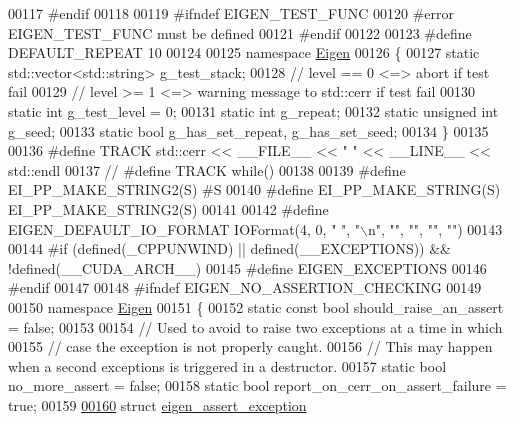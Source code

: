 \begin{DoxyCode}
00117 \textcolor{preprocessor}{#endif}
00118 
00119 \textcolor{preprocessor}{#ifndef EIGEN\_TEST\_FUNC}
00120 \textcolor{preprocessor}{#error EIGEN\_TEST\_FUNC must be defined}
00121 \textcolor{preprocessor}{#endif}
00122 
00123 \textcolor{preprocessor}{#define DEFAULT\_REPEAT 10}
00124 
00125 \textcolor{keyword}{namespace }\hyperlink{namespace_eigen}{Eigen}
00126 \{
00127   \textcolor{keyword}{static} std::vector<std::string> g\_test\_stack;
00128   \textcolor{comment}{// level == 0 <=> abort if test fail}
00129   \textcolor{comment}{// level >= 1 <=> warning message to std::cerr if test fail}
00130   \textcolor{keyword}{static} \textcolor{keywordtype}{int} g\_test\_level = 0;
00131   \textcolor{keyword}{static} \textcolor{keywordtype}{int} g\_repeat;
00132   \textcolor{keyword}{static} \textcolor{keywordtype}{unsigned} \textcolor{keywordtype}{int} g\_seed;
00133   \textcolor{keyword}{static} \textcolor{keywordtype}{bool} g\_has\_set\_repeat, g\_has\_set\_seed;
00134 \}
00135 
00136 \textcolor{preprocessor}{#define TRACK std::cerr << \_\_FILE\_\_ << " " << \_\_LINE\_\_ << std::endl}
00137 \textcolor{comment}{// #define TRACK while()}
00138 
00139 \textcolor{preprocessor}{#define EI\_PP\_MAKE\_STRING2(S) #S}
00140 \textcolor{preprocessor}{#define EI\_PP\_MAKE\_STRING(S) EI\_PP\_MAKE\_STRING2(S)}
00141 
00142 \textcolor{preprocessor}{#define EIGEN\_DEFAULT\_IO\_FORMAT IOFormat(4, 0, "  ", "\(\backslash\)n", "", "", "", "")}
00143 
00144 \textcolor{preprocessor}{#if (defined(\_CPPUNWIND) || defined(\_\_EXCEPTIONS)) && !defined(\_\_CUDA\_ARCH\_\_)}
00145 \textcolor{preprocessor}{  #define EIGEN\_EXCEPTIONS}
00146 \textcolor{preprocessor}{#endif}
00147 
00148 \textcolor{preprocessor}{#ifndef EIGEN\_NO\_ASSERTION\_CHECKING}
00149 
00150   \textcolor{keyword}{namespace }\hyperlink{namespace_eigen}{Eigen}
00151   \{
00152     \textcolor{keyword}{static} \textcolor{keyword}{const} \textcolor{keywordtype}{bool} should\_raise\_an\_assert = \textcolor{keyword}{false};
00153 
00154     \textcolor{comment}{// Used to avoid to raise two exceptions at a time in which}
00155     \textcolor{comment}{// case the exception is not properly caught.}
00156     \textcolor{comment}{// This may happen when a second exceptions is triggered in a destructor.}
00157     \textcolor{keyword}{static} \textcolor{keywordtype}{bool} no\_more\_assert = \textcolor{keyword}{false};
00158     \textcolor{keyword}{static} \textcolor{keywordtype}{bool} report\_on\_cerr\_on\_assert\_failure = \textcolor{keyword}{true};
00159 
\hyperlink{struct_eigen_1_1eigen__assert__exception}{00160}     \textcolor{keyword}{struct }\hyperlink{struct_eigen_1_1eigen__assert__exception}{eigen\_assert\_exception}

\end{DoxyCode}

